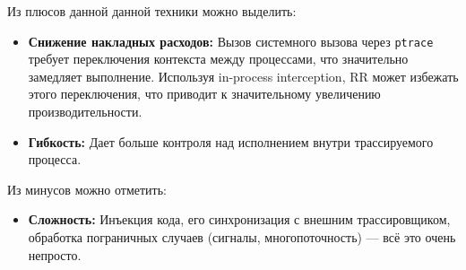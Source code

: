 Из плюсов данной данной техники можно выделить:
\begin{itemize}

  \item \textbf{Снижение накладных расходов: } Вызов системного вызова через
  \texttt{ptrace} требует переключения контекста между процессами, что
  значительно замедляет выполнение. Используя in-process interception, RR может
  избежать этого переключения, что приводит к значительному увеличению
  производительности.

  \item \textbf{Гибкость: } Дает больше контроля над исполнением внутри
  трассируемого процесса.

\end{itemize}

Из минусов можно отметить:

\begin{itemize}

  \item \textbf{Сложность: } Инъекция кода, его синхронизация с внешним
  трассировщиком, обработка пограничных случаев (сигналы, многопоточность) ---
  всё это очень непросто.

\end{itemize}





